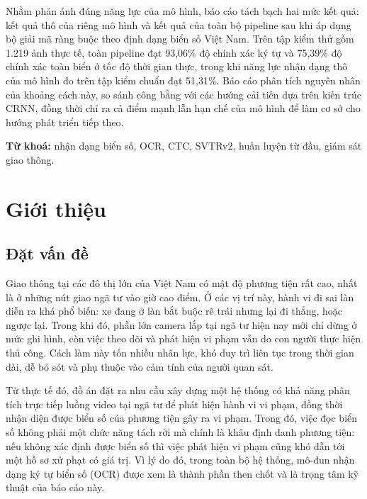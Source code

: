 \documentclass[12pt,a4paper]{report}
\begin{document}
Nhằm phản ánh đúng năng lực của mô hình, báo cáo tách bạch hai mức kết quả: kết quả thô của riêng mô hình và kết quả của toàn bộ pipeline sau khi áp dụng bộ giải mã ràng buộc theo định dạng biển số Việt Nam. Trên tập kiểm thử gồm 1.219 ảnh thực tế, toàn pipeline đạt 93,06\% độ chính xác ký tự và 75,39\% độ chính xác toàn biển ở tốc độ thời gian thực, trong khi năng lực nhận dạng thô của mô hình đo trên tập kiểm chuẩn đạt 51,31\%. Báo cáo phân tích nguyên nhân của khoảng cách này, so sánh công bằng với các hướng cải tiến dựa trên kiến trúc CRNN, đồng thời chỉ ra cả điểm mạnh lẫn hạn chế của mô hình để làm cơ sở cho hướng phát triển tiếp theo.

\vspace{0.6em}
\noindent\textbf{Từ khoá:} nhận dạng biển số, OCR, CTC, SVTRv2, huấn luyện từ đầu, giám sát giao thông.

\tableofcontents

\chapter{Giới thiệu}

\section{Đặt vấn đề}
Giao thông tại các đô thị lớn của Việt Nam có mật độ phương tiện rất cao, nhất là ở những nút giao ngã tư vào giờ cao điểm. Ở các vị trí này, hành vi đi sai làn diễn ra khá phổ biến: xe đang ở làn bắt buộc rẽ trái nhưng lại đi thẳng, hoặc ngược lại. Trong khi đó, phần lớn camera lắp tại ngã tư hiện nay mới chỉ dừng ở mức ghi hình, còn việc theo dõi và phát hiện vi phạm vẫn do con người thực hiện thủ công. Cách làm này tốn nhiều nhân lực, khó duy trì liên tục trong thời gian dài, dễ bỏ sót và phụ thuộc vào cảm tính của người quan sát.

Từ thực tế đó, đồ án đặt ra nhu cầu xây dựng một hệ thống có khả năng phân tích trực tiếp luồng video tại ngã tư để phát hiện hành vi vi phạm, đồng thời nhận diện được biển số của phương tiện gây ra vi phạm. Trong đó, việc đọc biển số không phải một chức năng tách rời mà chính là khâu định danh phương tiện: nếu không xác định được biển số thì việc phát hiện vi phạm cũng khó dẫn tới một hồ sơ xử phạt có giá trị. Vì lý do đó, trong toàn bộ hệ thống, mô-đun nhận dạng ký tự biển số (OCR) được xem là thành phần then chốt và là trọng tâm kỹ thuật của báo cáo này.
\end{document}

